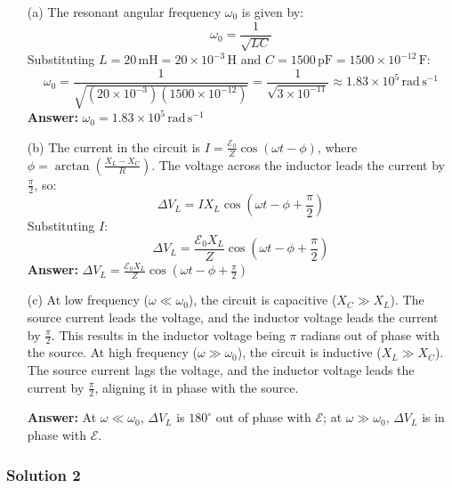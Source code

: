 \documentclass{article}
\begin{document}
\begin{enumerate}
    \item[(a)] The resonant angular frequency $\omega_0$ is given by:
    \[
    \omega_0 = \frac{1}{\sqrt{LC}}
    \]
    Substituting $L = 20\,\mathrm{mH} = 20 \times 10^{-3}\,\mathrm{H}$ and $C = 1500\,\mathrm{pF} = 1500 \times 10^{-12}\,\mathrm{F}$:
    \[
    \omega_0 = \frac{1}{\sqrt{(20 \times 10^{-3})(1500 \times 10^{-12})}} = \frac{1}{\sqrt{3 \times 10^{-11}}} \approx 1.83 \times 10^5\,\mathrm{rad\,s^{-1}}
    \]
    \textbf{Answer:} $\boxed{\omega_0 = 1.83 \times 10^5\,\mathrm{rad\,s^{-1}}}$  

    \item[(b)] The current in the circuit is $I = \frac{\mathcal{E}_0}{Z} \cos(\omega t - \phi)$, where $\phi = \arctan\left(\frac{X_L - X_C}{R}\right)$. The voltage across the inductor leads the current by $\frac{\pi}{2}$, so:
    \[
    \Delta V_L = I X_L \cos\left(\omega t - \phi + \frac{\pi}{2}\right)
    \]
    Substituting $I$:
    \[
    \Delta V_L = \frac{\mathcal{E}_0 X_L}{Z} \cos\left(\omega t - \phi + \frac{\pi}{2}\right)
    \]
    \textbf{Answer:} $\boxed{\Delta V_L = \frac{\mathcal{E}_0 X_L}{Z} \cos\left(\omega t - \phi + \frac{\pi}{2}\right)}$  

    \item[(c)] At low frequency ($\omega \ll \omega_0$), the circuit is capacitive ($X_C \gg X_L$). The source current leads the voltage, and the inductor voltage leads the current by $\frac{\pi}{2}$. This results in the inductor voltage being $\pi$ radians out of phase with the source. At high frequency ($\omega \gg \omega_0$), the circuit is inductive ($X_L \gg X_C$). The source current lags the voltage, and the inductor voltage leads the current by $\frac{\pi}{2}$, aligning it in phase with the source.  

    \textbf{Answer:} At $\omega \ll \omega_0$, $\Delta V_L$ is $180^\circ$ out of phase with $\mathcal{E}$; at $\omega \gg \omega_0$, $\Delta V_L$ is in phase with $\mathcal{E}$.  
\end{enumerate}

\subsubsection{Solution 2}
\end{document}

